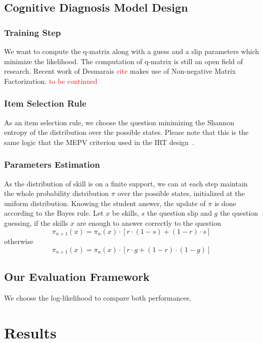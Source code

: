 \documentclass{sig-alternate}
\newcommand\alert[1]{\textcolor{red}{#1}}
\begin{document}
\subsection{Cognitive Diagnosis Model Design}

\subsubsection{Training Step}

We want to compute the q-matrix along with a guess and a slip parameters which minimize the likelihood. The computation of q-matrix is still an open field of research. Recent work of Desmarais \alert{cite} makes use of Non-negative Matrix Factorization. \alert{to be continued}

\subsubsection{Item Selection Rule}

As an item selection rule, we choose the question minimizing the Shannon entropy of the distribution over the possible states. Please note that this is the same logic that the MEPV criterion used in the IRT design~\cite{Cheng2009}.

\subsubsection{Parameters Estimation}

As the distribution of skill is on a finite support, we can at each step maintain the whole probability distribution $\pi$ over the possible states, initialized at the uniform distribution.
Knowing the student answer, the update of $\pi$ is done according to the Bayes rule. Let $x$ be skills, $s$ the question slip and $g$ the question guessing, if the skills $x$ are enough to answer correctly to the question
\[ \pi_{n+1}(x) = \pi_n(x) \cdot [r\cdot(1-s) + (1-r)\cdot s] \]
otherwise
\[ \pi_{n+1}(x) = \pi_n(x) \cdot [r\cdot g + (1-r)\cdot(1-g)] \]

\subsection{Our Evaluation Framework}

We choose the log-likelihood to compare both performances.

\section{Results}
\end{document}
